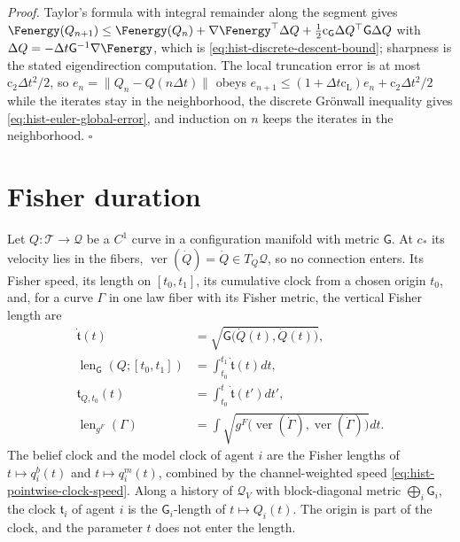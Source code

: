 \noindent\emph{Proof.}
Taylor's formula with integral remainder along the segment gives
$\Fenergy(Q_{n+1})\leq\Fenergy(Q_n)+\nabla\Fenergy^\top\Delta Q+\tfrac12\mathrm
c_{\mathsf G}\Delta Q^\top\mathsf G\Delta Q$ with
$\Delta Q=-\Delta t\mathsf G^{-1}\nabla\Fenergy$, which is
\eqref{eq:hist-discrete-descent-bound}; sharpness is the stated eigendirection
computation.  The local truncation error is at most $\mathrm c_2\Delta t^2/2$, so
$e_n=\lVert Q_n-Q(n\Delta t)\rVert$ obeys
$e_{n+1}\leq(1+\Delta t\mathrm c_{\mathrm L})e_n+\mathrm c_2\Delta t^2/2$ while the iterates
stay in the neighborhood, the discrete Gr\"onwall inequality gives
\eqref{eq:hist-euler-global-error}, and induction on $n$ keeps the iterates in the
neighborhood.  $\square$

\section{Fisher duration}
\label{sec:hist-fisher-duration}
\label{sec:pb-curve-taxonomy}
\label{sec:hist-clock-tiers}

Let $Q:\mathcal T\to\mathcal Q$ be a $C^1$ curve in a configuration manifold with metric
$\mathsf G$.  At $c_*$ its velocity lies in the fibers, $\operatorname{ver}(\dot Q)=\dot
Q\in T_Q\mathcal Q$, so no connection enters.  Its Fisher speed, its length on
$[t_0,t_1]$, its cumulative clock from a chosen origin $t_0$, and, for a curve $\Gamma$
in one law fiber with its Fisher metric, the vertical Fisher length are
\begin{align}
\dot{\mathfrak t}(t)
&=\sqrt{\mathsf G\bigl(\dot Q(t),\dot Q(t)\bigr)},
\label{eq:hist-fisher-speed}\\
\operatorname{len}_{\mathsf G}(Q;[t_0,t_1])
&=\int_{t_0}^{t_1}\dot{\mathfrak t}(t) dt,
\label{eq:hist-fisher-length}\\
\mathfrak t_{Q,t_0}(t)
&=\int_{t_0}^{t}\dot{\mathfrak t}(t') dt',
\label{eq:hist-cumulative-fisher-clock}\\
\operatorname{len}_{g^F}(\Gamma)
&=\int\sqrt{g^F\bigl(\operatorname{ver}(\dot\Gamma),\operatorname{ver}(\dot\Gamma)\bigr)} dt .
\label{eq:pb-vertical-fisher-length}
\end{align}
The belief clock and the model clock of agent $i$ are the Fisher lengths of
$t\mapsto q_i^b(t)$ and $t\mapsto q_i^m(t)$, combined by the channel-weighted speed
\eqref{eq:hist-pointwise-clock-speed}.  Along a history of $\mathcal Q_V$ with
block-diagonal metric $\bigoplus_i\mathsf G_i$, the clock $\mathfrak t_i$ of agent $i$ is
the $\mathsf G_i$-length of $t\mapsto Q_i(t)$.  The origin is part of the clock, and the
parameter $t$ does not enter the length.

